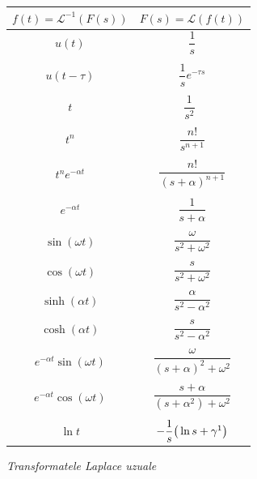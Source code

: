 \documentclass[12pt,a4paper]{article}
\newcommand\Lap{\mathcal{L}}
\theoremstyle{dotless}
\theoremstyle{dotlessdr}
\begin{document}
\begin{figure}[!htbp]
  \centering
  \begin{tabular}{c | c}
    $ f(t) = \Lap^{-1} (F(s)) $ & $ F(s) = \Lap(f(t)) $ \\
    \hline\hline
    $ u(t) $ & $ \dfrac{1}{s} $ \\
                                & \\
    $ u(t - \tau) $ & $ \dfrac{1}{s} e^{-\tau s} $ \\
                                & \\
    $ t $ & $ \dfrac{1}{s^2} $ \\
                                & \\
    $ t^n $ & $ \dfrac{n!}{s^{n+1}} $ \\
                                & \\
    $ t^n e^{-\alpha t} $ & $ \dfrac{n!}{(s + \alpha)^{n+1}} $ \\
                                & \\
    $ e^{-\alpha t} $ & $ \dfrac{1}{s + \alpha} $ \\
                                & \\
    $ \sin (\omega t) $ & $ \dfrac{\omega}{s^2 + \omega^2} $ \\
                                & \\
    $ \cos (\omega t) $ & $ \dfrac{s}{s^2 + \omega^2} $ \\
                                & \\
    $ \sinh(\alpha t) $ & $ \dfrac{\alpha}{s^2 - \alpha^2} $ \\
                                & \\
    $ \cosh(\alpha t) $ & $ \dfrac{s}{s^2 - \alpha^2} $ \\
                                & \\
    $ e^{-\alpha t}\sin(\omega t) $ & $ \dfrac{\omega}{(s + \alpha)^2 + \omega^2} $ \\
                                & \\
    $ e^{-\alpha t}\cos(\omega t) $ & $ \dfrac{s + \alpha}{(s + \alpha^2) + \omega^2} $ \\
                                & \\
    $ \ln t $ & $ -\dfrac{1}{s} \big( \ln s + \gamma\footnotemark \big) $
  \end{tabular}
  \caption{\emph{Transformatele Laplace uzuale}}
\end{figure}
\end{document}
